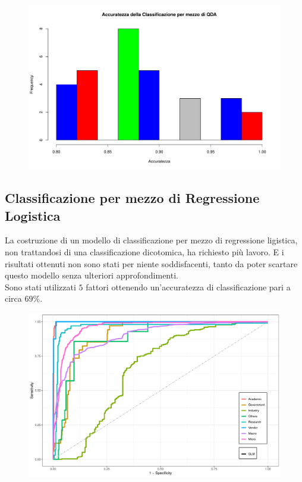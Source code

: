 \documentclass[11pt,a4paper]{article}
\begin{document}
\begin{figure}[H]
	\hspace{-0.5cm}
	\includegraphics[scale=.6]{imgs/QDA_hist.pdf}
\end{figure}
\subsection{Classificazione per mezzo di Regressione Logistica}
La costruzione di un modello di classificazione per mezzo di regressione
ligistica, non trattandosi di una classificazione dicotomica, ha richiesto pi\`u
lavoro. E i risultati ottenuti non sono stati per niente soddisfacenti, tanto da
poter scartare questo modello senza ulteriori approfondimenti.\\
Sono stati utilizzati $5$ fattori ottenendo un'accuratezza di classificazione
pari a circa $69\%$.
\begin{figure}[H]
	\hspace{-0.5cm}
	\includegraphics[scale=.60]{imgs/GLM_ggplot.pdf}
\end{figure}
\end{document}
